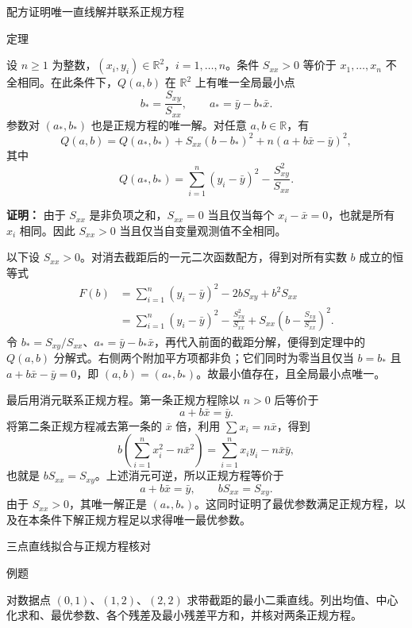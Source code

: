 \documentclass[aspectratio=169,10pt,fontset=fandol]{ctexbeamer}
\begin{document}
\begin{frame}[t,fragile]{配方证明唯一直线解并联系正规方程}
\footnotesize
\begin{block}{定理}
{\footnotesize
设 $n\geq1$ 为整数，$(x_i,y_i)\in\mathbb{R}^2$，$i=1,\ldots,n$。条件 $S_{xx}>0$ 等价于 $x_1,\ldots,x_n$ 不全相同。在此条件下，$Q(a,b)$ 在 $\mathbb{R}^2$ 上有唯一全局最小点
\[
b_* =\frac{S_{xy}}{S_{xx}},\qquad a_* =\bar{y}-b_*\bar{x}.
\]
参数对 $(a_*,b_*)$ 也是正规方程的唯一解。对任意 $a,b\in\mathbb{R}$，有
\[
Q(a,b)=Q(a_*,b_*)+S_{xx}(b-b_*)^2+n(a+b\bar{x}-\bar{y})^2,
\]
其中
\[
Q(a_*,b_*)=\sum_{i=1}^{n}(y_i-\bar{y})^2-\frac{S_{xy}^2}{S_{xx}}.
\]

}
\end{block}
\pause
{\footnotesize
\textbf{证明：}
由于 $S_{xx}$ 是非负项之和，$S_{xx}=0$ 当且仅当每个 $x_i-\bar{x}=0$，也就是所有 $x_i$ 相同。因此 $S_{xx}>0$ 当且仅当自变量观测值不全相同。

以下设 $S_{xx}>0$。对消去截距后的一元二次函数配方，得到对所有实数 $b$ 成立的恒等式
\[
\begin{aligned}
F(b)
&=\sum_{i=1}^{n}(y_i-\bar{y})^2-2bS_{xy}+b^2S_{xx}\\
&=\sum_{i=1}^{n}(y_i-\bar{y})^2-\frac{S_{xy}^2}{S_{xx}}
  +S_{xx}\left(b-\frac{S_{xy}}{S_{xx}}\right)^2.
\end{aligned}
\]
令 $b_*=S_{xy}/S_{xx}$、$a_*=\bar{y}-b_*\bar{x}$，再代入前面的截距分解，便得到定理中的 $Q(a,b)$ 分解式。右侧两个附加平方项都非负；它们同时为零当且仅当 $b=b_*$ 且 $a+b\bar{x}-\bar{y}=0$，即 $(a,b)=(a_*,b_*)$。故最小值存在，且全局最小点唯一。

最后用消元联系正规方程。第一条正规方程除以 $n>0$ 后等价于
\[
a+b\bar{x}=\bar{y}.
\]
将第二条正规方程减去第一条的 $\bar{x}$ 倍，利用 $\sum x_i=n\bar{x}$，得到
\[
b\left(\sum_{i=1}^{n}x_i^2-n\bar{x}^2\right)
=\sum_{i=1}^{n}x_i y_i-n\bar{x}\bar{y},
\]
也就是 $bS_{xx}=S_{xy}$。上述消元可逆，所以正规方程等价于
\[
a+b\bar{x}=\bar{y},\qquad bS_{xx}=S_{xy}.
\]
由于 $S_{xx}>0$，其唯一解正是 $(a_*,b_*)$。这同时证明了最优参数满足正规方程，以及在本条件下解正规方程足以求得唯一最优参数。

}
\end{frame}
\begin{frame}[t,fragile]{三点直线拟合与正规方程核对}
\normalsize
\begin{block}{例题}
{\normalsize
对数据点 $(0,1)$、$(1,2)$、$(2,2)$ 求带截距的最小二乘直线。列出均值、中心化求和、最优参数、各个残差及最小残差平方和，并核对两条正规方程。

}
\end{block}
\end{frame}
\end{document}
